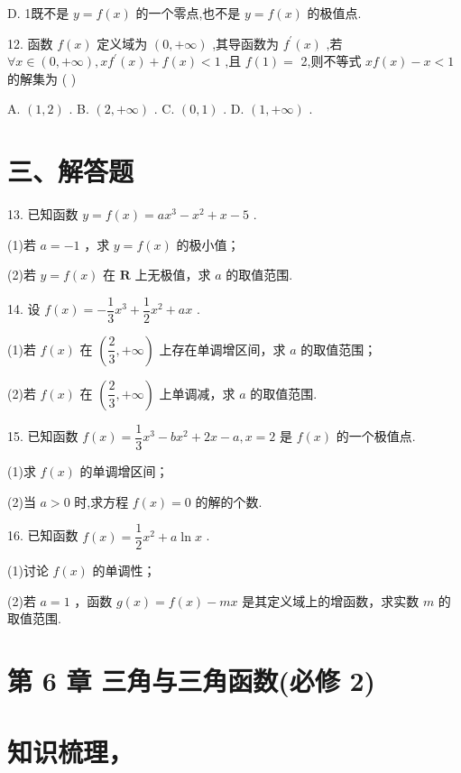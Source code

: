 D. 1既不是 $y = f\left( x\right)$ 的一个零点,也不是 $y = f\left( x\right)$ 的极值点.

12. 函数 $f\left( x\right)$ 定义域为 $\left( {0, + \infty }\right)$ ,其导函数为 ${f}^{\prime }\left( x\right)$ ,若 $\forall x \in  \left( {0, + \infty }\right) ,x{f}^{\prime }\left( x\right)  + f\left( x\right)  < 1$ ,且 $f\left( 1\right)  =$ 2,则不等式 ${xf}\left( x\right)  - x < 1$ 的解集为 ( )

A. $\left( {1,2}\right)$ . B. $\left( {2, + \infty }\right)$ . C. $\left( {0,1}\right)$ . D. $\left( {1, + \infty }\right)$ .

\section*{三、解答题}

13. 已知函数 $y = f\left( x\right)  = a{x}^{3} - {x}^{2} + x - 5$ .

(1)若 $a =  - 1$ ，求 $y = f\left( x\right)$ 的极小值；

(2)若 $y = f\left( x\right)$ 在 $\mathbf{R}$ 上无极值，求 $a$ 的取值范围.

14. 设 $f\left( x\right)  =  - \dfrac{1}{3}{x}^{3} + \dfrac{1}{2}{x}^{2} + {ax}$ .

(1)若 $f\left( x\right)$ 在 $\left( {\dfrac{2}{3}, + \infty }\right)$ 上存在单调增区间，求 $a$ 的取值范围；

(2)若 $f\left( x\right)$ 在 $\left( {\dfrac{2}{3}, + \infty }\right)$ 上单调减，求 $a$ 的取值范围.

15. 已知函数 $f\left( x\right)  = \dfrac{1}{3}{x}^{3} - b{x}^{2} + {2x} - a,x = 2$ 是 $f\left( x\right)$ 的一个极值点.

(1)求 $f\left( x\right)$ 的单调增区间；

(2)当 $a > 0$ 时,求方程 $f\left( x\right)  = 0$ 的解的个数.

16. 已知函数 $f\left( x\right)  = \dfrac{1}{2}{x}^{2} + a\ln x$ .

(1)讨论 $f\left( x\right)$ 的单调性；

(2)若 $a = 1$ ，函数 $g\left( x\right)  = f\left( x\right)  - {mx}$ 是其定义域上的增函数，求实数 $m$ 的取值范围.

\section*{第 6 章 三角与三角函数(必修 2)}

\section*{知识梳理，}

